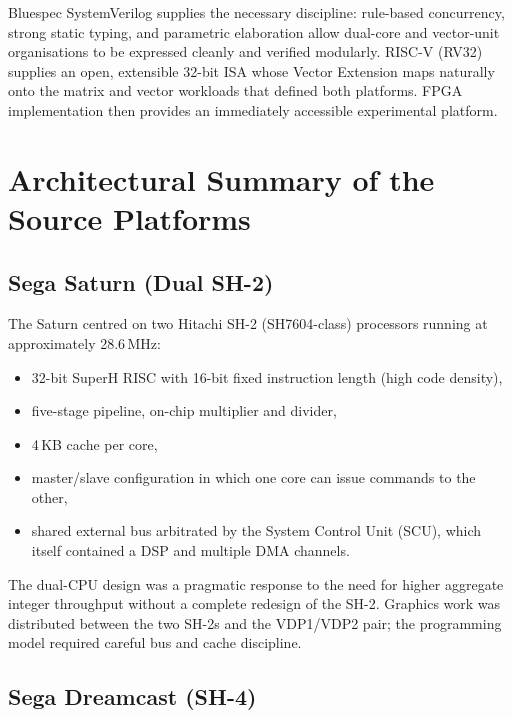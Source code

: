 \documentclass[11pt,a4paper]{article}
\begin{document}
Bluespec SystemVerilog supplies the necessary discipline: rule-based concurrency, strong static typing, and parametric elaboration allow dual-core and vector-unit organisations to be expressed cleanly and verified modularly. RISC-V (RV32) supplies an open, extensible 32-bit ISA whose Vector Extension maps naturally onto the matrix and vector workloads that defined both platforms. FPGA implementation then provides an immediately accessible experimental platform.

\section{Architectural Summary of the Source Platforms}

\subsection{Sega Saturn (Dual SH-2)}

The Saturn centred on two Hitachi SH-2 (SH7604-class) processors running at approximately 28.6\,MHz:
\begin{itemize}[leftmargin=1.5em]
  \item 32-bit SuperH RISC with 16-bit fixed instruction length (high code density),
  \item five-stage pipeline, on-chip multiplier and divider,
  \item 4\,KB cache per core,
  \item master/slave configuration in which one core can issue commands to the other,
  \item shared external bus arbitrated by the System Control Unit (SCU), which itself contained a DSP and multiple DMA channels.
\end{itemize}
The dual-CPU design was a pragmatic response to the need for higher aggregate integer throughput without a complete redesign of the SH-2. Graphics work was distributed between the two SH-2s and the VDP1/VDP2 pair; the programming model required careful bus and cache discipline.

\subsection{Sega Dreamcast (SH-4)}
\end{document}
